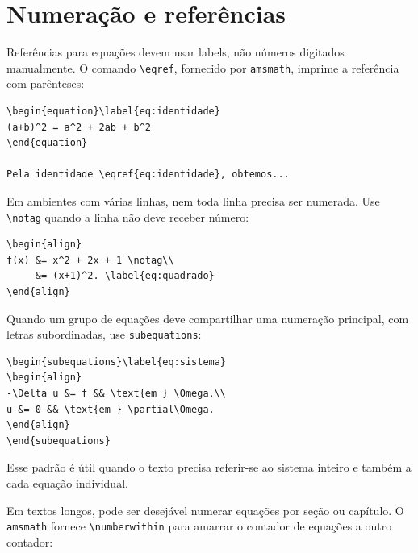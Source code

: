 \section{Numeração e referências}

Referências para equações devem usar labels, não números digitados manualmente. O comando \verb|\eqref|, fornecido por \texttt{amsmath}, imprime a referência com parênteses:

\begin{lstlisting}[language={[latex]TeX}, caption={Referência a equação}]
\begin{equation}\label{eq:identidade}
(a+b)^2 = a^2 + 2ab + b^2
\end{equation}

Pela identidade \eqref{eq:identidade}, obtemos...
\end{lstlisting}

Em ambientes com várias linhas, nem toda linha precisa ser numerada. Use \verb|\notag| quando a linha não deve receber número:

\begin{lstlisting}[language={[latex]TeX}, caption={Controle de numeração por linha}]
\begin{align}
f(x) &= x^2 + 2x + 1 \notag\\
     &= (x+1)^2. \label{eq:quadrado}
\end{align}
\end{lstlisting}

Quando um grupo de equações deve compartilhar uma numeração principal, com letras subordinadas, use \texttt{subequations}:

\begin{lstlisting}[language={[latex]TeX}, caption={Numeração subordinada}]
\begin{subequations}\label{eq:sistema}
\begin{align}
-\Delta u &= f && \text{em } \Omega,\\
u &= 0 && \text{em } \partial\Omega.
\end{align}
\end{subequations}
\end{lstlisting}

Esse padrão é útil quando o texto precisa referir-se ao sistema inteiro e também a cada equação individual.

Em textos longos, pode ser desejável numerar equações por seção ou capítulo. O \texttt{amsmath} fornece \verb|\numberwithin| para amarrar o contador de equações a outro contador:

